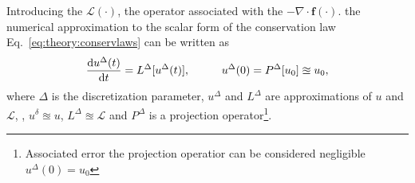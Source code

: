 %
%
% 
Introducing the $\mathcal{L}(\cdot)$, the operator associated with the $-\nabla\cdot\boldsymbol{f}(\cdot)$.
the numerical approximation to the scalar form of the conservation law Eq.~\eqref{eq:theory:conservlaws} can be written as 
%
\begin{equation}
\frac{\text{d}u^{\Delta}(t)}{\text{d}t} = L^{\Delta}[u^{\Delta}(t)], \hspace{10mm} u^{\Delta}(0) = P^{\Delta}[u_0] \approxeq u_0,
\label{eq:theory:conservlawsodepde}
\end{equation}
%
where $\Delta$ is the discretization parameter,
$u^{\Delta}$ and $L^{\Delta}$ are approximations of $u$ and $\mathcal{L}$, \ie, $u^{\delta}\approxeq u$, $L^{\Delta}\approxeq \mathcal{L}$ and $P^{\Delta}$ is a projection operator\footnote{
    Associated error the projection operatior can be considered negligible $u^{\Delta}(0) = u_0$
}. 

